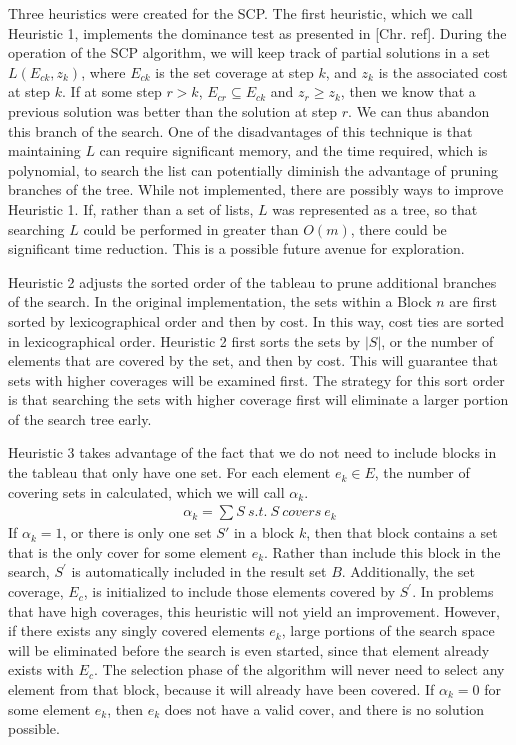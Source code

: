 \documentclass[12pt]{article}
\begin{document}
Three heuristics were created for the SCP. The first heuristic, which we call Heuristic 1, implements the dominance test as presented in [Chr. ref]. During the operation of the SCP algorithm, we will keep track of partial solutions in a set $L(E_{ck}, z_k)$, where $E_{ck}$ is the set coverage at step $k$, and $z_k$ is the associated cost at step $k$. If at some step $r > k$, $E_{cr} \subseteq E_{ck}$ and $z_r \geq z_k$, then we know that a previous solution was better than the solution at step $r$. We can thus abandon this branch of the search. One of the disadvantages of this technique is that maintaining $L$ can require significant memory, and the time required, which is polynomial, to search the list can potentially diminish the advantage of pruning branches of the tree. While not implemented, there are possibly ways to improve Heuristic 1. If, rather than a set of lists, $L$ was represented as a tree, so that searching $L$ could be performed in greater than $O(m)$, there could be significant time reduction. This is a possible future avenue for exploration.

Heuristic 2 adjusts the sorted order of the tableau to prune additional branches of the search. In the original implementation, the sets within a Block $n$ are first sorted by lexicographical order and then by cost. In this way, cost ties are sorted in lexicographical order. Heuristic 2 first sorts the sets by $|S|$, or the number of elements that are covered by the set, and then by cost. This will guarantee that sets with higher coverages will be examined first. The strategy for this sort order is that searching the sets with higher coverage first will eliminate a larger portion of the search tree early.

Heuristic 3 takes advantage of the fact that we do not need to include blocks in the tableau that only have one set. For each element $e_k \in E$, the number of covering sets in calculated, which we will call $\alpha_k$. 
\begin{align*}
\alpha_k = \sum S\:s.t.\:S\:covers\:e_k 
\end{align*}
If $\alpha_k = 1$, or there is only one set $S\prime$ in a block $k$, then that block contains a set that is the only cover for some element $e_k$. Rather than include this block in the search, $S^\prime$ is automatically included in the result set $B$. Additionally, the set coverage, $E_c$, is initialized to include those elements covered by $S^\prime$. In problems that have high coverages, this heuristic will not yield an improvement. However, if there exists any singly covered elements $e_k$, large portions of the search space will be eliminated before the search is even started, since that element already exists with $E_c$. The selection phase of the algorithm will never need to select any element from that block, because it will already have been covered.  If $\alpha_k = 0$ for some element $e_k$, then $e_k$ does not have a valid cover, and there is no solution possible.
\end{document}
